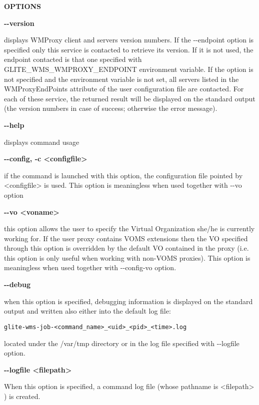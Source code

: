 \medskip\textbf{OPTIONS}\smallskip



\textbf{-{}-version}

displays WMProxy client and servers version numbers.
If the -{}-endpoint option is specified only this service is contacted to retrieve its version. If it is not used, the endpoint contacted is that one specified with GLITE\_WMS\_WMPROXY\_ENDPOINT environment variable. If the option is not specified and the environment variable is not set, all servers listed in the WMProxyEndPoints attribute of the user configuration file are contacted. For each of these service, the returned result will be displayed on the standard output (the version numbers in case of success; otherwise the error message).




\textbf{-{}-help}

displays command usage




\textbf{-{}-config, -c <configfile>}

if the command is launched with this option, the configuration file pointed by <configfile> is used. This option is meaningless when used together with -{}-vo option




\textbf{-{}-vo <voname>}

this option allows the user to specify the Virtual Organization she/he is currently working for.
If the user proxy contains VOMS extensions then the VO specified through this option is overridden by the
default VO contained in the proxy (i.e. this option is only useful when working with non-VOMS proxies).
This option is meaningless when used together with -{}-config-vo option.




\textbf{-{}-debug}

when this option is specified, debugging information is displayed on the standard output and written also either into the default log file:


\begin{verbatim}
glite-wms-job-<command_name>_<uid>_<pid>_<time>.log
\end{verbatim}

located under the /var/tmp  directory or in the log file specified with -{}-logfile option.




\textbf{-{}-logfile <filepath>}

When this option is specified, a command log file (whose pathname is <filepath> ) is created.



